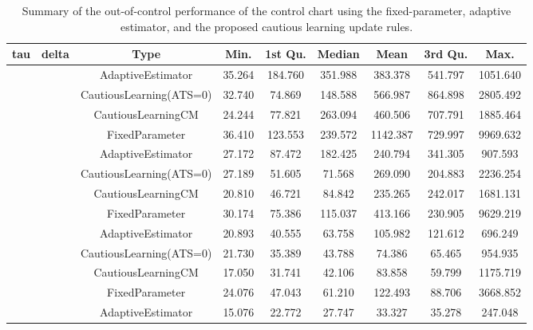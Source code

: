 \begin{table}[!h]

\caption{Summary of the out-of-control performance of the control chart using the fixed-parameter, adaptive estimator, and the proposed cautious learning update rules.}
\centering
\begin{tabular}[t]{ccccccccc}
\toprule
tau & delta & Type & Min. & 1st Qu. & Median & Mean & 3rd Qu. & Max.\\
\midrule
 &  & AdaptiveEstimator & 35.264 & 184.760 & 351.988 & 383.378 & 541.797 & 1051.640\\

 &  & CautiousLearning(ATS=0) & 32.740 & 74.869 & 148.588 & 566.987 & 864.898 & 2805.492\\

 &  & CautiousLearningCM & 24.244 & 77.821 & 263.094 & 460.506 & 707.791 & 1885.464\\

 & \multirow[t]{-4}{*}{\centering\arraybackslash 0.25} & FixedParameter & 36.410 & 123.553 & 239.572 & 1142.387 & 729.997 & 9969.632\\
\cmidrule{2-9}
 &  & AdaptiveEstimator & 27.172 & 87.472 & 182.425 & 240.794 & 341.305 & 907.593\\

 &  & CautiousLearning(ATS=0) & 27.189 & 51.605 & 71.568 & 269.090 & 204.883 & 2236.254\\

 &  & CautiousLearningCM & 20.810 & 46.721 & 84.842 & 235.265 & 242.017 & 1681.131\\

 & \multirow[t]{-4}{*}{\centering\arraybackslash 0.35} & FixedParameter & 30.174 & 75.386 & 115.037 & 413.166 & 230.905 & 9629.219\\
\cmidrule{2-9}
 &  & AdaptiveEstimator & 20.893 & 40.555 & 63.758 & 105.982 & 121.612 & 696.249\\

 &  & CautiousLearning(ATS=0) & 21.730 & 35.389 & 43.788 & 74.386 & 65.465 & 954.935\\

 &  & CautiousLearningCM & 17.050 & 31.741 & 42.106 & 83.858 & 59.799 & 1175.719\\

 & \multirow[t]{-4}{*}{\centering\arraybackslash 0.50} & FixedParameter & 24.076 & 47.043 & 61.210 & 122.493 & 88.706 & 3668.852\\
\cmidrule{2-9}
 &  & AdaptiveEstimator & 15.076 & 22.772 & 27.747 & 33.327 & 35.278 & 247.048\\


\end{tabular}
\end{table}
